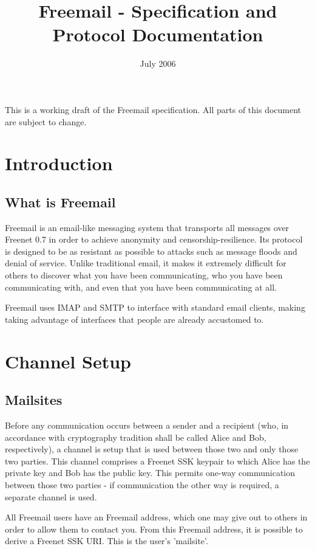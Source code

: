 \documentclass[12pt,a4paper]{article}
\begin{document}
\title{Freemail - Specification and Protocol Documentation}
\date{July 2006}
\maketitle

This is a working draft of the Freemail specification. All parts of this document are subject to change.

\section{Introduction}
\subsection{What is Freemail}
Freemail is an email-like messaging system that transports all messages over Freenet 0.7 in order to achieve anonymity and censorship-resilience. Its protocol is designed to be as resistant as possible to attacks such as message floods and denial of service. Unlike traditional email, it makes it extremely difficult for others to discover what you have been communicating, who you have been communicating with, and even that you have been communicating at all.

Freemail uses IMAP and SMTP to interface with standard email clients, making taking advantage of interfaces that people are already accustomed to.

\section{Channel Setup}
\subsection{Mailsites}
Before any communication occurs between a sender and a recipient (who, in accordance with cryptography tradition shall be called Alice and Bob, respectively), a channel is setup that is used between those two and only those two parties. This channel comprises a Freenet SSK keypair to which Alice has the private key and Bob has the public key. This permits one-way communication between those two parties - if communication the other way is required, a separate channel is used.

All Freemail users have an Freemail address, which one may give out to others in order to allow them to contact you. From this Freemail address, it is possible to derive a Freenet SSK URI. This is the user's 'mailsite'.
\end{document}
